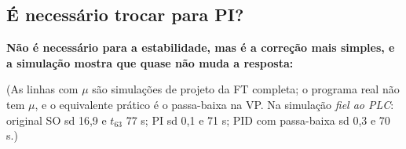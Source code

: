 \documentclass[11pt,a4paper]{article}
\begin{document}
\subsection{É necessário trocar para PI?}
\textbf{Não é necessário para a estabilidade, mas é a correção mais simples, e a simulação mostra que quase não muda a resposta:}
\begin{center}\small{}\end{center}
(As linhas com $\mu$ são simulações de projeto da FT completa; o programa real não tem $\mu$, e o equivalente prático é o passa-baixa na VP. Na simulação \emph{fiel ao PLC}: original SO sd 16,9 e $t_{63}$ 77 s; PI sd 0,1 e 71 s; PID com passa-baixa sd 0,3 e 70 s.)
\end{document}
